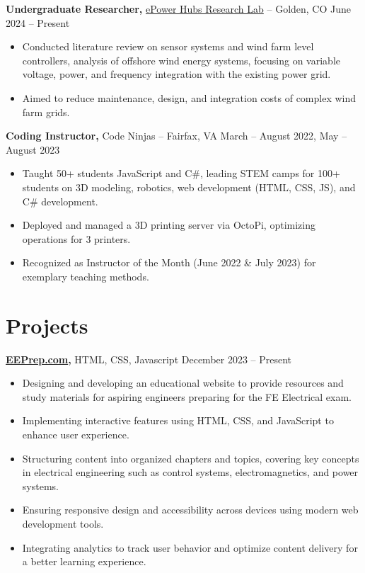 \documentclass[11pt]{article}       %
\begin{document}
\textbf{Undergraduate Researcher, }{\href{https://www.epowerhubs.com/home}{ePower Hubs Research Lab}} -- Golden, CO \hfill June 2024 -- Present \\
\vspace{-6.5pt}
\begin{itemize}
  \item Conducted literature review on sensor systems and wind farm level controllers, analysis of offshore wind energy systems, focusing on variable voltage, power, and frequency integration with the existing power grid.
  \item Aimed to reduce maintenance, design, and integration costs of complex wind farm grids.
\end{itemize}


\textbf{Coding Instructor, }{Code Ninjas} -- Fairfax, VA \hfill March -- August 2022, May -- August 2023 \\
\vspace{-6.5pt}
\begin{itemize}
  \item Taught 50+ students JavaScript and C\#, leading STEM camps for 100+ students on 3D modeling, robotics, web development (HTML, CSS, JS), and C\# development.
  \item Deployed and managed a 3D printing server via OctoPi, optimizing operations for 3 printers.
  \item Recognized as Instructor of the Month (June 2022 \& July 2023) for exemplary teaching methods.
\end{itemize}

\vspace{-19pt}
\section*{Projects}

\textbf{\href{https://eeprep.com}{EEPrep.com}, }{HTML, CSS, Javascript } \hfill {December 2023 -- Present} \\
\vspace{-6.5pt}
\begin{itemize}
    \item Designing and developing an educational website to provide resources and study materials for aspiring engineers preparing for the FE Electrical exam.
    \item Implementing interactive features using HTML, CSS, and JavaScript to enhance user experience.
    \item Structuring content into organized chapters and topics, covering key concepts in electrical engineering such as control systems, electromagnetics, and power systems.
    \item Ensuring responsive design and accessibility across devices using modern web development tools.
    \item Integrating analytics to track user behavior and optimize content delivery for a better learning experience.
\end{itemize}
\end{document}
